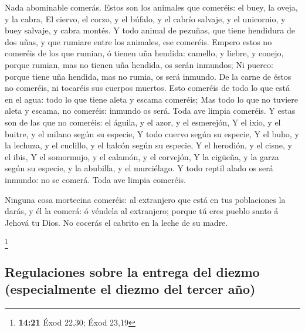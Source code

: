  Nada abominable comerás.  Estos son los
animales que comeréis: el buey, la oveja, y la cabra,  El
ciervo, el corzo, y el búfalo, y el cabrío salvaje, y el unicornio, y
buey salvaje, y cabra montés.  Y todo animal de pezuñas,
que tiene hendidura de dos uñas, y que rumiare entre los animales, ese
comeréis.  Empero estos no comeréis de los que rumian, ó
tienen uña hendida: camello, y liebre, y conejo, porque rumian, mas no
tienen uña hendida, os serán inmundos;  Ni puerco: porque
tiene uña hendida, mas no rumia, os será inmundo. De la carne de éstos
no comeréis, ni tocaréis sus cuerpos muertos.  Esto
comeréis de todo lo que está en el agua: todo lo que tiene aleta y
escama comeréis;  Mas todo lo que no tuviere aleta y
escama, no comeréis: inmundo os será.  Toda ave limpia
comeréis.  Y estas son de las que no comeréis: el águila,
y el azor, y el esmerejón,  Y el ixio, y el buitre, y el
milano según su especie,  Y todo cuervo según su especie,
 Y el buho, y la lechuza, y el cuclillo, y el halcón
según su especie,  Y el herodión, y el cisne, y el ibis,
 Y el somormujo, y el calamón, y el corvejón,
 Y la cigüeña, y la garza según su especie, y la
abubilla, y el murciélago.  Y todo reptil alado os será
inmundo: no se comerá.  Toda ave limpia comeréis.

 Ninguna cosa mortecina comeréis: al extranjero que está
en tus poblaciones la darás, y él la comerá: ó véndela al extranjero;
porque tú eres pueblo santo á Jehová tu Dios. No cocerás el cabrito en
la leche de su madre.

\footnote{\textbf{14:21} Éxod 22,30; Éxod 23,19}

\hypertarget{regulaciones-sobre-la-entrega-del-diezmo-especialmente-el-diezmo-del-tercer-auxf1o}{%
\subsection{Regulaciones sobre la entrega del diezmo (especialmente el
diezmo del tercer
año)}\label{regulaciones-sobre-la-entrega-del-diezmo-especialmente-el-diezmo-del-tercer-auxf1o}}

